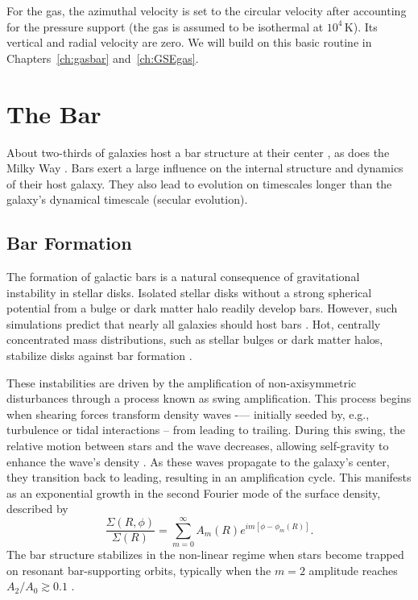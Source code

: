 For the gas, the azimuthal velocity is set to the circular velocity after accounting for the pressure support (the gas is assumed to be isothermal at $10^4\,\textrm{K}$). Its vertical and radial velocity are zero. We will build on this basic routine in Chapters~\ref{ch:gasbar} and~\ref{ch:GSEgas}.

\section{The Bar}
About two-thirds of galaxies host a bar structure at their center \citep{2000AJ....119..536E, 2007ApJ...657..790M}, as does the Milky Way \citep{1991ApJ...379..631B}. Bars exert a large influence on the internal structure and dynamics of their host galaxy. They also lead to evolution on timescales longer than the galaxy's dynamical timescale (secular evolution).

\subsection{Bar Formation}
The formation of galactic bars is a natural consequence of gravitational instability in stellar disks. Isolated stellar disks without a strong spherical potential from a bulge or dark matter halo readily develop bars. However, such simulations predict that nearly all galaxies should host bars \citep{1971ApJ...168..343H}. Hot, centrally concentrated mass distributions, such as stellar bulges or dark matter halos, stabilize disks against bar formation \citep[e.g.,][]{1973ApJ...186..467O, 1976AJ.....81...30H}.

These instabilities are driven by the amplification of non-axisymmetric disturbances through a process known as swing amplification. This process begins when shearing forces transform density waves -— initially seeded by, e.g., turbulence or tidal interactions -- from leading to trailing. During this swing, the relative motion between stars and the wave decreases, allowing self-gravity to enhance the wave's density \citep{1965MNRAS.130..125G,1966ApJ...146..810J,1981seng.proc..111T}. As these waves propagate to the galaxy's center, they transition back to leading, resulting in an amplification cycle. This manifests as an exponential growth in the second Fourier mode of the surface density, described by
\begin{equation}
\frac{\Sigma\left(R, \phi\right)}{\Sigma\left(R\right)} = \sum_{m=0}^{\infty} A_{m}\left(R\right) e^{im\left[\phi-\phi_m(R)\right]}\textrm{.}
\end{equation}
The bar structure stabilizes in the non-linear regime when stars become trapped on resonant bar-supporting orbits, typically when the $m=2$ amplitude reaches $A_2/A_0\gtrsim0.1$ \citep[e.g.][]{2018MNRAS.477.1451F,2023ApJ...947...80B}.

